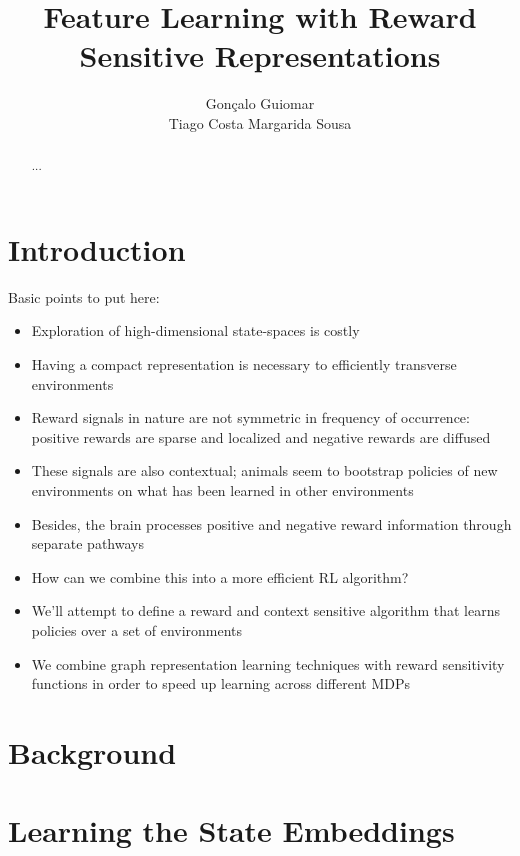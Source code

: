 \documentclass{article}
\title{Feature Learning with Reward Sensitive Representations}
\author{
  Gonçalo Guiomar \\
  \And
  Tiago Costa
  \And
  Margarida Sousa
}
\begin{document}
\maketitle

\begin{abstract}
  ...
\end{abstract}

\section{Introduction}

Basic points to put here:

\begin{itemize}
  \item Exploration of high-dimensional state-spaces is costly
  \item Having a compact representation is necessary to efficiently transverse environments
  \item Reward signals in nature are not symmetric in frequency of occurrence: positive rewards are sparse and localized and negative rewards are diffused
  \item These signals are also contextual; animals seem to bootstrap policies of new environments on what has been learned in other environments
  \item Besides, the brain processes positive and negative reward information through separate pathways
  \item How can we combine this into a more efficient RL algorithm?
  \item We'll attempt to define a reward and context sensitive algorithm that learns policies over a set of environments
  \item We combine graph representation learning techniques with reward sensitivity functions in order to speed up learning across different MDPs
\end{itemize}

\section{Background}

\section{Learning the State Embeddings}

\end{document}
